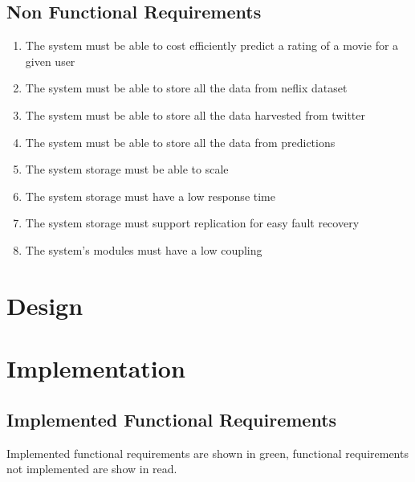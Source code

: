\section{Non Functional Requirements}
\begin{enumerate}[label=\bfseries NFR \arabic*:]
  \item The system must be able to cost efficiently predict a rating of a movie for a given user
  \item The system must be able to store all the data from neflix dataset
  \item The system must be able to store all the data harvested from twitter
  \item The system must be able to store all the data from predictions
  \item The system storage must be able to scale
  \item The system storage must have a low response time
  \item The system storage must support replication for easy fault recovery
  \item The system's modules must have a low coupling
\end{enumerate}


\chapter{Design}\label{app:design}

\chapter{Implementation}\label{app:impl}
\section{Implemented Functional Requirements}
Implemented functional requirements are shown in green, functional requirements not implemented are show in read.

